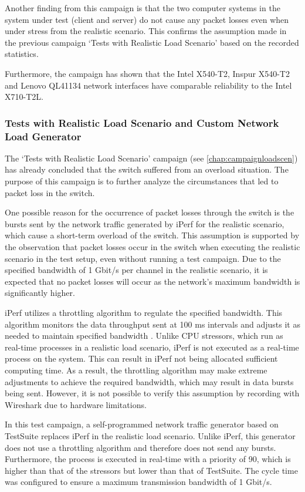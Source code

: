 Another finding from this campaign is that the two computer systems in the system under test (client and server) do not cause any packet losses even when under stress from the realistic scenario. This confirms the assumption made in the previous campaign `Tests with Realistic Load Scenario' based on the recorded statistics.

Furthermore, the campaign has shown that the Intel X540-T2, Inspur X540-T2 and Lenovo QL41134 network interfaces have comparable reliability to the Intel X710-T2L.

\subsubsection{Tests with Realistic Load Scenario and Custom Network Load Generator}
The `Tests with Realistic Load Scenario' campaign (see \ref{chap:campaignloadscen}) has already concluded that the switch suffered from an overload situation. The purpose of this campaign is to further analyze the circumstances that led to packet loss in the switch.

One possible reason for the occurrence of packet losses through the switch is the bursts sent by the network traffic generated by iPerf for the realistic scenario, which cause a short-term overload of the switch. This assumption is supported by the observation that packet losses occur in the switch when executing the realistic scenario in the test setup, even without running a test campaign. Due to the specified bandwidth of 1 Gbit/s per channel in the realistic scenario, it is expected that no packet losses will occur as the network's maximum bandwidth is significantly higher.

iPerf utilizes a throttling algorithm to regulate the specified bandwidth. This algorithm monitors the data throughput sent at 100 ms intervals and adjusts it as needed to maintain specified bandwidth \cite{reli03}. Unlike \ac{CPU} stressors, which run as real-time processes in a realistic load scenario, iPerf is not executed as a real-time process on the system. This can result in iPerf not being allocated sufficient computing time. As a result, the throttling algorithm may make extreme adjustments to achieve the required bandwidth, which may result in data bursts being sent. However, it is not possible to verify this assumption by recording with Wireshark due to hardware limitations.

In this test campaign, a self-programmed network traffic generator based on TestSuite replaces iPerf in the realistic load scenario. Unlike iPerf, this generator does not use a throttling algorithm and therefore does not send any bursts. Furthermore, the process is executed in real-time with a priority of 90, which is higher than that of the stressors but lower than that of TestSuite. The cycle time was configured to ensure a maximum transmission bandwidth of 1 Gbit/s.

